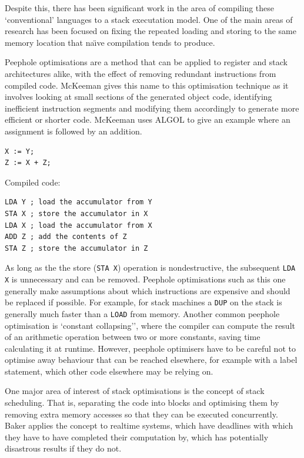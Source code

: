 Despite this, there has been significant work in the area of compiling these
`conventional' languages to a stack executation model. One of the main areas of
research has been focused on fixing the repeated loading and storing to the same
memory location that na{\"\i}ve compilation tends to produce.

Peephole optimisations are a method that can be applied to register and stack
architectures alike, with the effect of removing redundant instructions from
compiled code. McKeeman gives this name to this optimisation technique as it
involves looking at small sections of the generated object code, identifying
inefficient instruction segments and modifying them accordingly to generate
more efficient or shorter code. McKeeman uses ALGOL to give an example where an
assignment is followed by an addition.

\begin{minipage}{.25\textwidth}
  \centering
  \begin{lstlisting}[language=Algol]
X := Y;
Z := X + Z;
  \end{lstlisting}
\end{minipage}%
\begin{minipage}{.55\textwidth}
  Compiled code:
  \begin{lstlisting}
LDA Y ; load the accumulator from Y
STA X ; store the accumulator in X
LDA X ; load the accumulator from X
ADD Z ; add the contents of Z
STA Z ; store the accumulator in Z
  \end{lstlisting}
\end{minipage}

As long as the the store (\lstinline{STA X}) operation is nondestructive, the
subsequent \lstinline{LDA X} is unnecessary and can be removed. Peephole
optimisations such as this one generally make assumptions about which
instructions are expensive and should be replaced if possible. For example, for
stack machines a \lstinline{DUP} on the stack is generally much faster than a
\lstinline{LOAD} from memory. Another common peephole optimisation is `constant
collapsing'', where the compiler can compute the result of an arithmetic
operation between two or more constants, saving time calculating it at runtime.
However, peephole optimisers have to be careful not to optimise away behaviour
that can be reached elsewhere, for example with a label statement, which other
code elsewhere may be relying on.\cite{McKeeman1965Peephole}

One major area of interest of stack optimisations is the concept of stack
scheduling. That is, separating the code into blocks and optimising them by
removing extra memory accesses so that they can be executed concurrently. Baker
applies the concept to realtime systems, which have deadlines with which they
have to have completed their computation by, which has potentially disastrous
results if they do not.\cite{Baker1991Stack}


